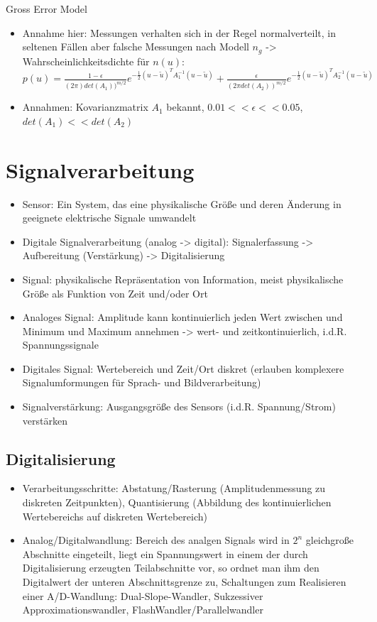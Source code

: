 \documentclass[paper=a4, fontsize=11pt]{scrartcl} %
\numberwithin{equation}{section} %
\numberwithin{figure}{section} %
\numberwithin{table}{section} %
\begin{document}
Gross Error Model
\begin{itemize}
\item Annahme hier: Messungen verhalten sich in der Regel normalverteilt, in seltenen Fällen aber falsche Messungen nach Modell $n_g$ -> Wahrscheinlichkeitsdichte für $n(u)$:\\ $p(u) = \frac{1-\epsilon}{(2\pi) det(A_1))^{m/2}}e^{-\frac{1}{2}(u-\tilde{u})^T A_1^{-1}(u-\tilde{u})} + \frac{\epsilon}{(2\pi det(A_2))^{m/2}} e^{-\frac{1}{2}(u-\tilde{u})^T A_2^{-1}(u-\tilde{u})}$
\item Annahmen: Kovarianzmatrix $A_1$ bekannt, $0.01 << \epsilon << 0.05$, $det(A_1) << det(A_2)$
\end{itemize}

\section{Signalverarbeitung}

\begin{itemize}
\item Sensor: Ein System, das eine physikalische Größe und deren Änderung in geeignete elektrische Signale umwandelt
\item Digitale Signalverarbeitung (analog -> digital): Signalerfassung -> Aufbereitung (Verstärkung) -> Digitalisierung
\item Signal: physikalische Repräsentation von Information, meist physikalische Größe als Funktion von Zeit und/oder Ort
\item Analoges Signal: Amplitude kann kontinuierlich jeden Wert zwischen und Minimum und Maximum annehmen -> wert- und zeitkontinuierlich, i.d.R. Spannungssignale
\item Digitales Signal: Wertebereich und Zeit/Ort diskret (erlauben komplexere Signalumformungen für Sprach- und Bildverarbeitung)
\item Signalverstärkung: Ausgangsgröße des Sensors (i.d.R. Spannung/Strom) verstärken
\end{itemize}

\subsection{Digitalisierung}

\begin{itemize}
\item Verarbeitungsschritte: Abstatung/Rasterung (Amplitudenmessung zu diskreten Zeitpunkten), Quantisierung (Abbildung des kontinuierlichen Wertebereichs auf diskreten Wertebereich)
\item Analog/Digitalwandlung: Bereich des analgen Signals wird in $2^n$ gleichgroße Abschnitte eingeteilt, liegt ein Spannungswert in einem der durch Digitalisierung erzeugten Teilabschnitte vor, so ordnet man ihm den Digitalwert der unteren Abschnittsgrenze zu, Schaltungen zum Realisieren einer A/D-Wandlung: Dual-Slope-Wandler, Sukzessiver Approximationswandler, FlashWandler/Parallelwandler
\end{itemize}
\end{document}
